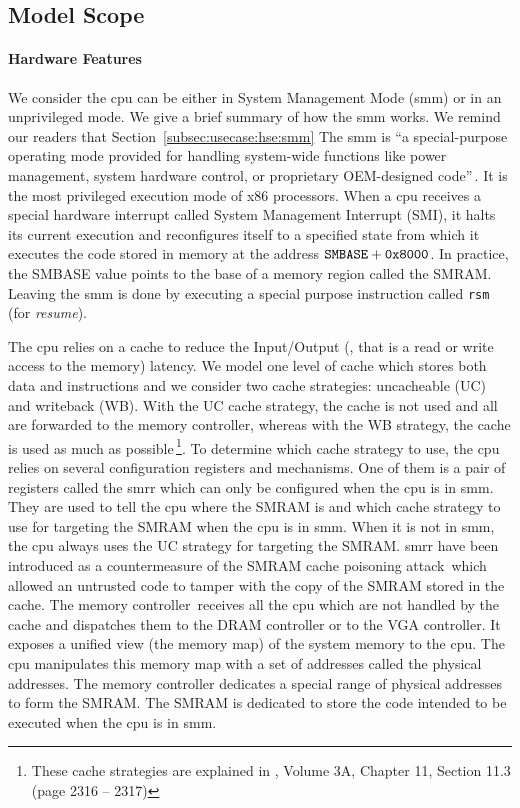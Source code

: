 \subsection{Model Scope}
\label{sec:speccert2:scope}

\paragraph{Hardware Features}
%
We consider the \ac{cpu} can be either in System Management Mode (\ac{smm}) or
in an unprivileged mode.
%
We give a brief summary of how the \ac{smm} works.
%
We remind our readers that Section~\ref{subsec:usecase:hse:smm}
%
The \ac{smm} is ``a special-purpose operating mode provided for handling
system-wide functions like power management, system hardware control, or
proprietary OEM-designed code''\,\cite{intel2014manual}.
%
It is the most privileged execution mode of x86 processors.
%
When a \ac{cpu} receives a special hardware interrupt called System Management
Interrupt (SMI), it halts its current execution and reconfigures itself to a
specified state from which it executes the code stored in memory at the address
$\mathtt{SMBASE} + \mathtt{0x8000}$.
%
In practice, the SMBASE value points to the base of a memory region called the
SMRAM.
%
Leaving the \ac{smm} is done by executing a special purpose instruction called
\texttt{rsm} (for \emph{resume}).

The \ac{cpu} relies on a cache to reduce the Input/Output (\IO, that is a read
or write access to the memory) latency.
%
We model one level of cache which stores both data and instructions and we
consider two cache strategies: uncacheable (UC) and writeback (WB).
%
With the UC cache strategy, the cache is not used and all \IOs are forwarded to
the memory controller, whereas with the WB strategy, the cache is used as much
as possible\,\footnote{These cache strategies are explained in
  \cite{intel2014manual}, Volume 3A, Chapter 11, Section 11.3 (page 2316 --
  2317)}.
%
To determine which cache strategy to use, the \ac{cpu} relies on several
configuration registers and mechanisms.
%
One of them is a pair of registers called the \ac{smrr} which can only be
configured when the \ac{cpu} is in \ac{smm}.
%
They are used to tell the \ac{cpu} where the SMRAM is and which cache strategy
to use for \IO targeting the SMRAM when the \ac{cpu} is in \ac{smm}.  When it is
not in \ac{smm}, the \ac{cpu} always uses the UC strategy for \IO targeting the
SMRAM.
%
\ac{smrr} have been introduced as a countermeasure of the SMRAM cache poisoning
attack\,\cite{wojtczuk2009smram,duflot2009smram} which allowed an untrusted code
to tamper with the copy of the SMRAM stored in the cache.
%
The memory controller\,\cite{intel2009mch} receives all the \ac{cpu} \IOs which
are not handled by the cache and dispatches them to the DRAM controller or to
the VGA controller. It exposes a unified view (the memory map) of the system
memory to the \ac{cpu}.
%
The \ac{cpu} manipulates this memory map with a set of addresses called the
physical addresses.
%
The memory controller dedicates a special range of physical addresses to form
the SMRAM.
%
The SMRAM is dedicated to store the code intended to be executed when the
\ac{cpu} is in \ac{smm}.


